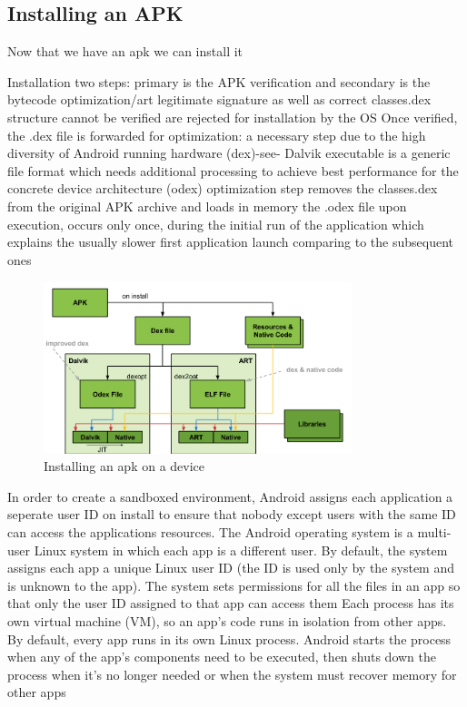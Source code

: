 \subsection{Installing an APK} \label{subsection:android-install}
Now that we have an apk we can install it

Installation two steps:  primary is the APK verification and secondary is the bytecode optimization/art\newline
legitimate signature as well as correct classes.dex structure cannot be verified are rejected for installation by the OS\newline
Once verified, the .dex file is forwarded for optimization: a necessary step due to the high diversity of Android running hardware (dex)-see- Dalvik executable is a generic file format which needs additional processing to achieve best performance for the concrete device architecture (odex)\newline
optimization\newline
step removes the classes.dex from the original APK archive and loads in memory the .odex file upon execution, occurs only once, during the initial run of the application which explains the usually slower first application launch comparing to the subsequent ones\cite{kovachevaMaster}
\begin{figure}[h]
    \centering
    \includegraphics[width=0.8\textwidth]{data/install.png}
    \caption{Installing an \gls{apk} on a device \cite{googleIOArt}}
    \label{fig:install}
\end{figure}

In order to create a sandboxed environment, Android assigns each application a seperate user ID on install to ensure that nobody except users with the same ID can access the applications resources.
The Android operating system is a multi-user Linux system in which each app is a different user.
By default, the system assigns each app a unique Linux user ID (the ID is used only by the system and is unknown to the app). The system sets permissions for all the files in an app so that only the user ID assigned to that app can access them
Each process has its own virtual machine (VM), so an app's code runs in isolation from other apps.
By default, every app runs in its own Linux process. Android starts the process when any of the app's components need to be executed, then shuts down the process when it's no longer needed or when the system must recover memory for other apps\cite{developerFundamentals}

